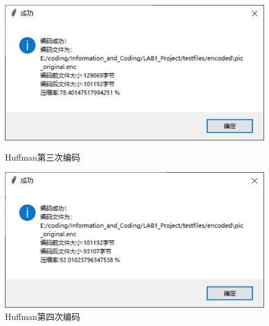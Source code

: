 \documentclass[12pt, a4paper]{ctexart}
\begin{document}
    \begin{figure}[H]
    \centering
    \begin{minipage}[t]{0.45\textwidth}
    \centering
    \includegraphics[width=\textwidth]{./pic/11-3.png}
    \caption{Huffman第三次编码}
    \end{minipage}
    \hfill
    \begin{minipage}[t]{0.45\textwidth}
    \centering
    \includegraphics[width=\textwidth]{./pic/11-4.png}
    \caption{Huffman第四次编码}
    \end{minipage}
    \end{figure}
\end{document}
